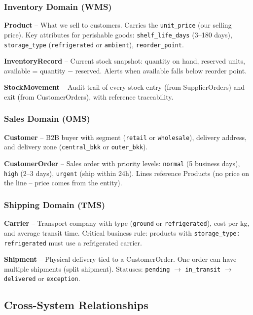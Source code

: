 \documentclass[11pt,a4paper]{article}
\begin{document}
\subsubsection{Inventory Domain (WMS)}

\textbf{Product} -- What we sell to customers. Carries the \texttt{unit\_price} (our selling price). Key attributes for perishable goods: \texttt{shelf\_life\_days} (3--180 days), \texttt{storage\_type} (\texttt{refrigerated} or \texttt{ambient}), \texttt{reorder\_point}.

\textbf{InventoryRecord} -- Current stock snapshot: quantity on hand, reserved units, available = quantity $-$ reserved. Alerts when available falls below reorder point.

\textbf{StockMovement} -- Audit trail of every stock entry (from SupplierOrders) and exit (from CustomerOrders), with reference traceability.

\subsubsection{Sales Domain (OMS)}

\textbf{Customer} -- B2B buyer with segment (\texttt{retail} or \texttt{wholesale}), delivery address, and delivery zone (\texttt{central\_bkk} or \texttt{outer\_bkk}).

\textbf{CustomerOrder} -- Sales order with priority levels: \texttt{normal} (5 business days), \texttt{high} (2--3 days), \texttt{urgent} (ship within 24h). Lines reference Products (no price on the line -- price comes from the entity).

\subsubsection{Shipping Domain (TMS)}

\textbf{Carrier} -- Transport company with type (\texttt{ground} or \texttt{refrigerated}), cost per kg, and average transit time. Critical business rule: products with \texttt{storage\_type: refrigerated} must use a refrigerated carrier.

\textbf{Shipment} -- Physical delivery tied to a CustomerOrder. One order can have multiple shipments (split shipment). Statuses: \texttt{pending} $\to$ \texttt{in\_transit} $\to$ \texttt{delivered} or \texttt{exception}.

\subsection{Cross-System Relationships}
\end{document}
